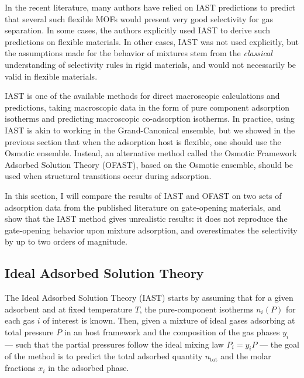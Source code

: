 \documentclass[thesis]{subfiles}
\begin{document}
In the recent literature, many authors have relied on IAST predictions to
predict that several such flexible MOFs would present very good selectivity for
gas separation. In some cases, the authors explicitly used IAST to derive such
predictions on flexible materials.\cite{Banerjee2014, Mukherjee2015, Foo2016,
Li2016} In other cases, IAST was not used explicitly, but the assumptions made
for the behavior of mixtures stem from the \emph{classical} understanding of
selectivity rules in rigid materials, and would not necessarily be valid in
flexible materials.\cite{Gucuyener2010, Inubushi2010, Nijem2012, Sanda2013,
Joarder2014, Mukherjee2014}

IAST is one of the available methods for direct macroscopic calculations and
predictions, taking macroscopic data in the form of pure component adsorption
isotherms and predicting macroscopic co-adsorption isotherms. In practice, using
IAST is akin to working in the Grand-Canonical ensemble, but we showed in the
previous section that when the adsorption host is flexible, one should use the
Osmotic ensemble. Instead, an alternative method called the Osmotic Framework
Adsorbed Solution Theory (OFAST),\cite{Coudert2009} based on the Osmotic
ensemble, should be used when structural transitions occur during adsorption.


In this section, I will compare the results of IAST and OFAST on two sets of
adsorption data from the published literature on gate-opening materials, and
show that the IAST method gives unrealistic results: it does not reproduce the
gate-opening behavior upon mixture adsorption, and overestimates the selectivity
by up to two orders of magnitude.

\subsection{Ideal Adsorbed Solution Theory}

The Ideal Adsorbed Solution Theory (IAST) starts by assuming that for a given
adsorbent and at fixed temperature $T$, the pure-component isotherms $n_i(P)$
for each gas $i$ of interest is known. Then, given a mixture of ideal gases
adsorbing at total pressure $P$ in an host framework and the composition of the
gas phases $y_i$ --- such that the partial pressures follow the ideal mixing law
$P_i = y_i P$ --- the goal of the method is to predict the total adsorbed
quantity $n_\text{tot}$ and the molar fractions $x_i$ in the adsorbed phase.
\end{document}
